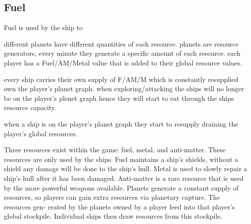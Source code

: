 \subsection{Fuel}
Fuel is used by the ship to 



		different planets have different quantities of each resource.
		planets are resource generators, every minute they generate a specific amount of each resource.
		each player has a Fuel/AM/Metal value that is added to their global resource values.

		every ship carries their own supply of F/AM/M which is constantly resupplied own the player's planet graph.
		when exploring/attacking the ships will no longer be on the player's plenet graph hence they will start to eat through the ships resource capacity.

		when a ship is on the player's planet graph they start to resupply draining the player's global resources.





Three resources exist within the game: fuel, metal, and anti-matter. These resources are only used by the ships. Fuel maintains a ship’s shields, without a shield any damage will be done to the ship’s hull. Metal is used to slowly repair a ship’s hull after it has been damaged. Anti-matter is a rare resource that is used by the more powerful weapons available.
Planets generate a constant supply of resources, so players can gain extra resources via planetary capture. The resources gen- erated by the planets owned by a player feed into that player’s global stockpile. Individual ships then draw resources from this stockpile.